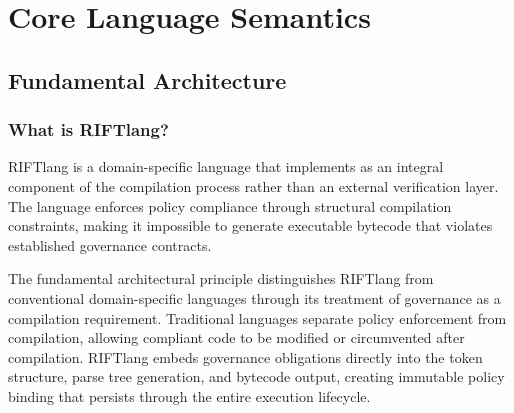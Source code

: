 \begin{abstract}
RIFTlang represents a paradigm shift in programming language design, implementing governance validation as an integral component of the compilation process rather than an external verification layer. This specification defines a domain-specific language that enforces policy compliance through structural compilation constraints, making it impossible to generate executable bytecode that violates established governance contracts. The language serves as the foundational compilation engine within the OBINexus Triangular Trust Infrastructure, enabling cryptographic policy enforcement and sustainable innovation through consumer-validated development.
\end{abstract}

\tableofcontents
\newpage

\chapter{Core Language Semantics}

\section{Fundamental Architecture}

\subsection{What is RIFTlang?}

RIFTlang is a domain-specific language that implements  as an integral component of the compilation process rather than an external verification layer. The language enforces policy compliance through structural compilation constraints, making it impossible to generate executable bytecode that violates established governance contracts.

The fundamental architectural principle distinguishes RIFTlang from conventional domain-specific languages through its treatment of governance as a compilation requirement. Traditional languages separate policy enforcement from compilation, allowing compliant code to be modified or circumvented after compilation. RIFTlang embeds governance obligations directly into the token structure, parse tree generation, and bytecode output, creating immutable policy binding that persists through the entire execution lifecycle.

